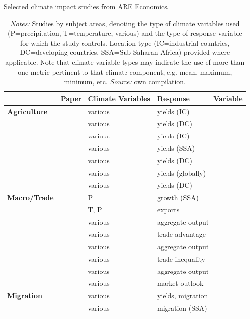 \documentclass[a4paper,12pt]{article}
\theoremstyle{plain}
\theoremstyle{definition}
\theoremstyle{definition}
\theoremstyle{definition}
\theoremstyle{definition}
\begin{document}
\begin{table}[H]
    \singlespacing
    \centering
    \caption{Selected climate impact studies from ARE Economics.}
    \caption*{\footnotesize{\textit{Notes:} Studies by subject areas, denoting the type of climate variables used (P=precipitation, T=temperature, various) and the type of response variable for which the study controls. Location type (IC=industrial countries, DC=developing countries, SSA=Sub-Saharan Africa) provided where applicable. Note that climate variable types may indicate the use of more than one metric pertinent to that climate component, e.g. mean, maximum, minimum, etc. \textit{Source:} own compilation.}}
    \begin{tabular}{|p{2.8cm}|p{6cm}|p{2.2cm}|p{3.5cm}| }
    \hline
    & \raggedright\textbf{Paper} & \textbf{Climate Variables} & \textbf{Response\ \ \ \ \ \ Variable} \\
    \hline    
    \textbf{Agriculture} & \citet{Deschenes2007} & various & yields (IC)\\
    \ \ & \citet{Mendelsohn2008} & various & yields (DC)\\
    \ \ & \citet{Schlenker2009} & various & yields (IC)\\
    \ \ & \citet{Schlenker2010} & various & yields (SSA)\\
    \ \ & \citet{Welch2010} & various & yields (DC)\\
    \ \ & \citet{Lobell2011}& various & yields (globally)\\
    \ \ & \citet{Hertel2014} & various & yields (DC)\\
    \hline
    \textbf{Macro/Trade} & \citet{Barrios2010} & P & growth (SSA)\\
    \ \ & \citet{Jones2010} & T, P & exports\\
    \ \ & \citet{Burke2015}& various & aggregate output\\
    \ \ & \citet{Costinot2016} & various & trade advantage\\
    \ \ & \citet{Deryugina2017}& various & aggregate output\\
    \ \ & \citet{Dingel2019} & various & trade inequality\\
    \ \ & \citet{Burke2019}& various & aggregate output\\
    \ \ & \citet{Schlenker2019} & various & market outlook\\
    \hline
    \textbf{Migration} & \citet{Feng2010}& various & yields, migration\\
    \ \ & \citet{Marchiori2012}& various & migration (SSA)\\

\end{tabular}
\end{table}
\end{document}
